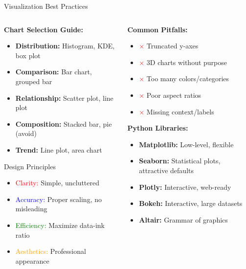 \documentclass[8pt,aspectratio=1610]{beamer}
\begin{document}
\begin{frame}{Visualization Best Practices}
\begin{columns}[t]
\begin{column}{0.48\textwidth}
\textbf{Chart Selection Guide:}
\begin{itemize}
\setlength{\itemsep}{1pt}
\item \textbf{Distribution:} Histogram, KDE, box plot
\item \textbf{Comparison:} Bar chart, grouped bar
\item \textbf{Relationship:} Scatter plot, line plot
\item \textbf{Composition:} Stacked bar, pie (avoid)
\item \textbf{Trend:} Line plot, area chart
\end{itemize}

\vspace{0.3cm}
\begin{block}{Design Principles}
\begin{itemize}
\setlength{\itemsep}{1pt}
\item \textcolor{red}{Clarity:} Simple, uncluttered
\item \textcolor{blue}{Accuracy:} Proper scaling, no misleading
\item \textcolor{green}{Efficiency:} Maximize data-ink ratio
\item \textcolor{orange}{Aesthetics:} Professional appearance
\end{itemize}
\end{block}
\end{column}

\begin{column}{0.48\textwidth}
\textbf{Common Pitfalls:}
\begin{itemize}
\setlength{\itemsep}{1pt}
\item \textcolor{red}{$\times$} Truncated y-axes
\item \textcolor{red}{$\times$} 3D charts without purpose
\item \textcolor{red}{$\times$} Too many colors/categories
\item \textcolor{red}{$\times$} Poor aspect ratios
\item \textcolor{red}{$\times$} Missing context/labels
\end{itemize}

\vspace{0.3cm}
\textbf{Python Libraries:}
\begin{itemize}
\setlength{\itemsep}{1pt}
\item \textbf{Matplotlib:} Low-level, flexible
\item \textbf{Seaborn:} Statistical plots, attractive defaults
\item \textbf{Plotly:} Interactive, web-ready
\item \textbf{Bokeh:} Interactive, large datasets
\item \textbf{Altair:} Grammar of graphics
\end{itemize}


\end{column}
\end{columns}
\end{frame}
\end{document}
